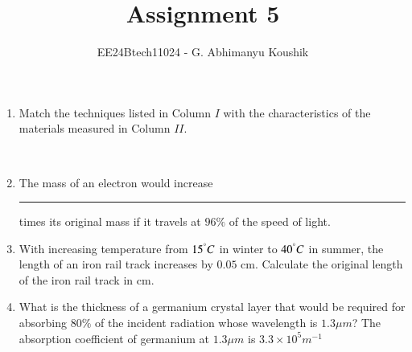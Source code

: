 \documentclass[journal,12pt,onecolumn]{IEEEtran}
\theoremstyle{remark}
\begin{document}
\title{Assignment 5}
\author{EE24Btech11024 - G. Abhimanyu Koushik}
\maketitle
\renewcommand{\thefigure}{\theenumi}
\renewcommand{\thetable}{\theenumi}
\begin{enumerate}

\item Match the techniques listed in Column $I$ with the characteristics of the materials measured in Column $II$.
\\\begin{table}[h!]    
  \centering
  
\end{table}\\

\hfill{}
\begin{enumerate}
\end{enumerate}

\item The mass of an electron would increase \rule{1cm}{0.15mm} times its original mass if it travels at $96\%$ of the speed of light.

\hfill{}

\item With increasing temperature from $15^\degree C$ in winter to $40^\degree C$ in summer, the length of an iron rail track increases by $0.05$ cm. Calculate the original length of the iron rail track in cm. \\

\hfill{}

\item What is the thickness of a germanium crystal layer that would be required for absorbing $80\%$ of the incident radiation whose wavelength is $1.3 \mu m$? The absorption coefficient \brak{\alpha} of germanium at $1.3 \mu m$ is $3.3\times 10^5 m^{-1}$

\hfill{}


\end{enumerate}
\end{document}
